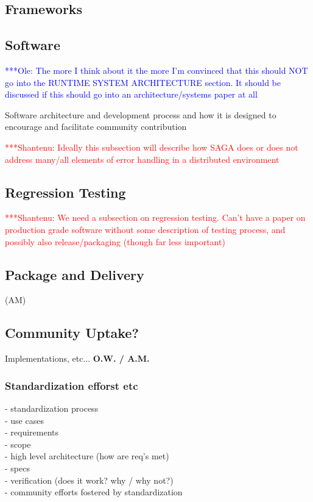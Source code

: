 \documentclass[a4paper,10pt]{article}
\newcommand{\jhanote}[1]{  {\textcolor{red}     { ***Shantenu: #1 }}}
\newcommand{\onote}[1]{  {\textcolor{blue}     { ***Ole: #1 }}}
\newcommand{\jhanote}[1]{}
\newcommand{\onote}[1]{}
\begin{document}
 \subsection{Frameworks}

  \subsection{Software }
  \onote{The more I think about it the more I'm convinced that this should NOT
  go into the RUNTIME SYSTEM ARCHITECTURE section. It should be discussed if
  this should go into an architecture/systems paper at all}
  
  Software architecture and development process and how it is designed to
  encourage and facilitate community contribution
    
  \jhanote{Ideally this subsection will describe how SAGA does or does not
  address many/all elements of error handling in a distributed environment}

  \subsection{Regression Testing} \jhanote{We need a subsection on regression
  testing. Can't have a paper on production grade software without some
  description of testing process, and possibly also release/packaging (though
  far less important)}
  
  \subsection{Package and Delivery} (AM)



 \subsection{Community Uptake?}

   Implementations, etc... \textbf{O.W. / A.M.}

   \subsubsection{Standardization efforst etc}

    - standardization process\\
      - use cases\\
      - requirements\\
      - scope\\
      - high level architecture (how are req's met)\\
      - specs\\
      - verification (does it work?  why / why not?)\\
    - community efforts fostered by standardization\\
\end{document}
